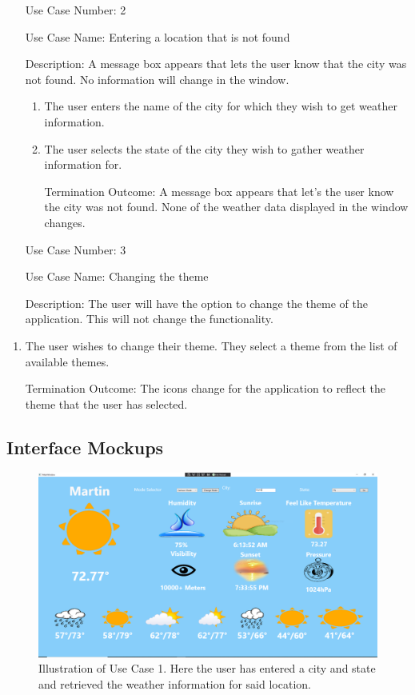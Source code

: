 \documentclass[10pt,conference,onecolumn,compsoc]{IEEEtran}
\begin{document}
\begin{itemize}
\item[Use Case Number:] 2
\item[Use Case Name:] Entering a location that is not found
\item[Description:] A message box appears that lets the user know that the city was not found. No information will change in the window.

\begin{enumerate}
\item The user enters the name of the city for which they wish to get weather information.
\item The user selects the state of the city they wish to gather weather information for. 
\item[Termination Outcome:] A message box appears that let's the user know the city was not found. None of the weather data displayed in the window changes.
\end{enumerate}

\end{itemize}

\begin{itemize}
\item[Use Case Number:] 3
\item[Use Case Name:] Changing the theme
\item[Description:] The user will have the option to change the theme of the application. This will not change the functionality.
\end{itemize}

\begin{enumerate}
\item The user wishes to change their theme. They select a theme from the list of available themes.
\item[Termination Outcome:] The icons change for the application to reflect the theme that the user has selected. 
\end{enumerate}

\subsection{Interface Mockups}
\begin{figure}[ht!]
\includegraphics[scale=0.1]{use_case_1.png}
\caption{Illustration of Use Case 1. Here the user has entered a city and state and retrieved the weather information for said location.}
\label{use_case_1}
\end{figure}
\end{document}
